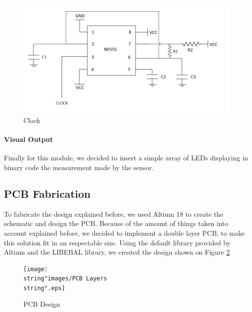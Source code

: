 \begin{figure}[H]
\begin{centering}
\includegraphics[scale=0.5]{images/CLOCK}
\par\end{centering}
\caption{Clock}

\label{8_8}

\end{figure}

\paragraph{Visual Output}

Finally for this module, we decided to insert a simple array of LEDs
displaying in binary code the measurement made by the sensor.

\subsection{PCB Fabrication}

To fabricate the design explained before, we used Altium 18 to create
the schematic and design the PCB. Because of the amount of things
taken into account explained before, we decided to implement a double
layer PCB, to make this solution fit in an respectable size. Using
the default library provided by Altium and the LIBEBAL library, we
created the design shown on Figure \ref{8_9}

\begin{figure}[H]
\begin{centering}
\texttt{[image: \\string"images/PCB Layers\\string".eps]}
\par\end{centering}
\caption{PCB Design}
\label{8_9}
\end{figure}

